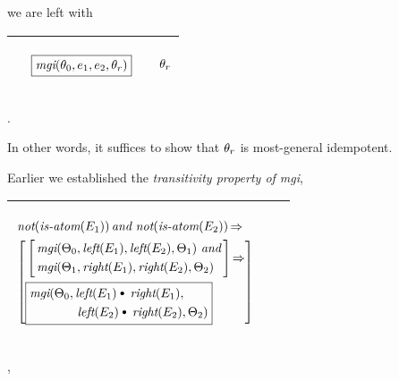 \documentclass[runningheads]{llncs}
\DeclareMathOperator{\uand}{\emph{and}\,}
\DeclareMathOperator{\unot}{\emph{not}\kern-.0pt}
\DeclareMathOperator{\uimplies}{\Rightarrow}
\DeclareMathOperator{\isatm}{\emph{is-atom}}
\DeclareMathOperator{\lef}{\emph{left}}
\DeclareMathOperator{\rig}{\emph{right}}
\DeclareMathOperator{\mgi}{\emph{mgi}}
\begin{document}
we are left with
\begin{center}
\begin{tabular}{|m{}|m{}||m{}|}
 \hline 
  & 
   \begin{center}
{$\begin{aligned}
  & \,\boxed{\mgi(\thet{0}, \e{1}, \e{2}, \thet{r})}
\end{aligned}$}
\end{center}
& 
\begin{center}

$ \begin{aligned}
   \theta_{r}
 \end{aligned}    
$
\end{center}
\\
\hline
\end{tabular}.
\end{center}
In other words, it suffices to show that $\theta_{r}$ is most-general idempotent.

Earlier we established the  \emph{transitivity property of mgi},
\begin{center}
  \begin{tabular}{|m{}|m{}||m{}|}
\hline
\begin{center}
$
\begin{aligned}
    &\unot(\isatm(\E{1})) \uand \unot(\isatm(\E{2})) \uimplies\\
&\left[    \begin{aligned}
   &\left[\begin{aligned}
  &\mgi (\Thet{0}, \lef(\E{1}), \lef(\E{2}), \Thet{1})
  \, \uand \\
   &\mgi (\Thet{1}, \rig(\E{1}), \rig(\E{2}), \Thet{2}) 
   \end{aligned}\right] \uimplies \\
  &
  \boxed{\begin{aligned}
  \mgi(\Thet{0}, &\lef(\E{1}) {\cons} \rig(\E{1}), \\
     &\,\lef(\E{2}) {\cons} \rig(\E{2}), \Thet{2})
   \end{aligned}}  
   \end{aligned} \right]
     \end{aligned}
     $
\end{center}
& &  \\  \hline
\end{tabular},
\end{center}
\end{document}
